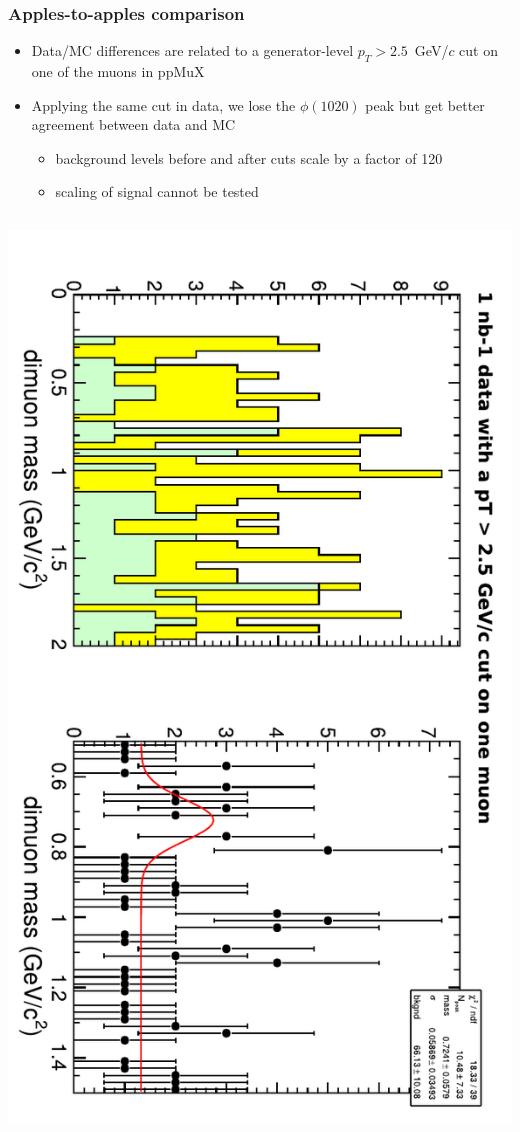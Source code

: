 \documentclass[compress]{beamer}
\begin{document}
\begin{frame}
\frametitle{Apples-to-apples comparison}

\begin{itemize}
\item Data/MC differences are related to a generator-level $p_T > 2.5$~GeV/$c$ cut on one of the muons in ppMuX

\item Applying the same cut in data, we lose the $\phi(1020)$ peak but get better agreement between data and MC
\begin{itemize}
\item background levels before and after cuts scale by a factor of 120
\item scaling of signal cannot be tested
\end{itemize}
\end{itemize}

\begin{columns}
\includegraphics[height=\linewidth, angle=90]{phi_to_mumu_cut25.pdf}


\end{columns}
\end{frame}
\end{document}
